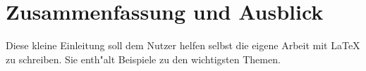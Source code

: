 \chapter{Zusammenfassung und Ausblick}

Diese kleine Einleitung soll dem Nutzer helfen selbst die eigene Arbeit mit \LaTeX{} zu schreiben. Sie enth"alt Beispiele zu den wichtigsten Themen.


